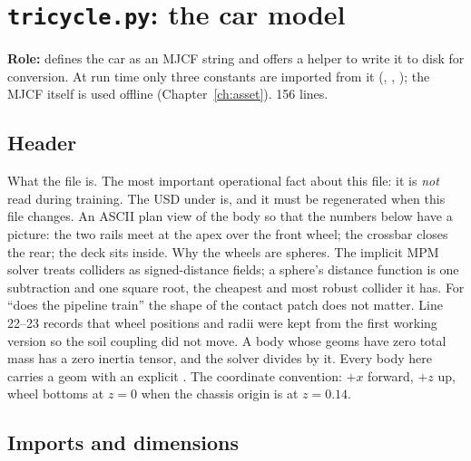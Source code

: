 \chapter{\texttt{tricycle.py}: the car model}
\label{ch:tricycle_py}

\textbf{Role:} defines the car as an MJCF string and offers a helper to write
it to disk for conversion. At run time only three constants are imported from
it (, , ); the MJCF itself
is used offline (Chapter~\ref{ch:asset}). 156 lines.

\section{Header}


\begin{explain}
 What the file is.
 The most important operational fact about this file: it is
  \emph{not} read during training. The USD under  is, and it
  must be regenerated when this file changes.
 An ASCII plan view of the body so that the numbers below have a
  picture: the two rails meet at the apex over the front wheel; the crossbar
  closes the rear; the deck sits inside.
 Why the wheels are spheres. The implicit MPM solver treats
  colliders as signed-distance fields; a sphere's distance function is one
  subtraction and one square root, the cheapest and most robust collider it
  has. For ``does the pipeline train'' the shape of the contact patch does
  not matter. Line 22--23 records that wheel positions and radii were kept
  from the first working version so the soil coupling did not move.
 A body whose geoms have zero total mass has a zero inertia
  tensor, and the solver divides by it. Every body here carries a geom with an
  explicit .
 The coordinate convention: $+x$ forward, $+z$ up, wheel bottoms
  at $z=0$ when the chassis origin is at $z=0.14$.
\end{explain}

\section{Imports and dimensions}


